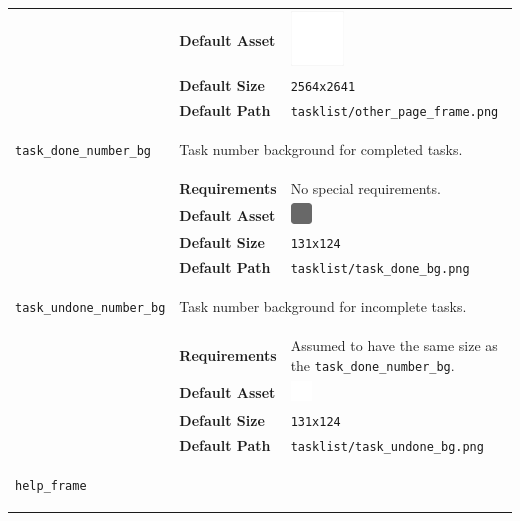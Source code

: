 \documentclass[a4paper, 10pt]{report}
\begin{document}
\begin{longtable}{| p{} p{} p{}|}
  & \textbf{Default Asset} & \centering\arraybackslash\includegraphics[width=0.25\textwidth, valign=m]{../base/assets/tasklist/other_page_frame.png}\\
  & \textbf{Default Size} & \texttt{2564x2641}\\
  & \textbf{Default Path} & \texttt{tasklist/other\_page\_frame.png}\\[2ex]
  \hypertarget{tasklist-task-done-number-bg}{\texttt{task\_done\_number\_bg}} & \multicolumn{2}{p{.70\textwidth+2\tabcolsep}|}{
    Task number background for completed tasks.
  }\\
  & \textbf{Requirements} & No special requirements.\\
  & \textbf{Default Asset} & \centering\arraybackslash\includegraphics[width=0.1\textwidth, valign=m]{../base/assets/tasklist/task_done_bg.png}\\
  & \textbf{Default Size} & \texttt{131x124}\\
  & \textbf{Default Path} & \texttt{tasklist/task\_done\_bg.png}\\[2ex]
  \hypertarget{tasklist-task-undone-number-bg}{\texttt{task\_undone\_number\_bg}} & \multicolumn{2}{p{.70\textwidth+2\tabcolsep}|}{
    Task number background for incomplete tasks.
  }\\
  & \textbf{Requirements} & Assumed to have the same size as the \texttt{task\_done\_number\_bg}.\\
  & \textbf{Default Asset} & \centering\arraybackslash\includegraphics[width=0.1\textwidth, valign=m]{../base/assets/tasklist/task_undone_bg.png}\\
  & \textbf{Default Size} & \texttt{131x124}\\
  & \textbf{Default Path} & \texttt{tasklist/task\_undone\_bg.png}\\
  \hypertarget{tasklist-help-frame}{\texttt{help\_frame}} & \multicolumn{2}{p{.70\textwidth+2\tabcolsep}|}{
}
\end{longtable}
\end{document}
